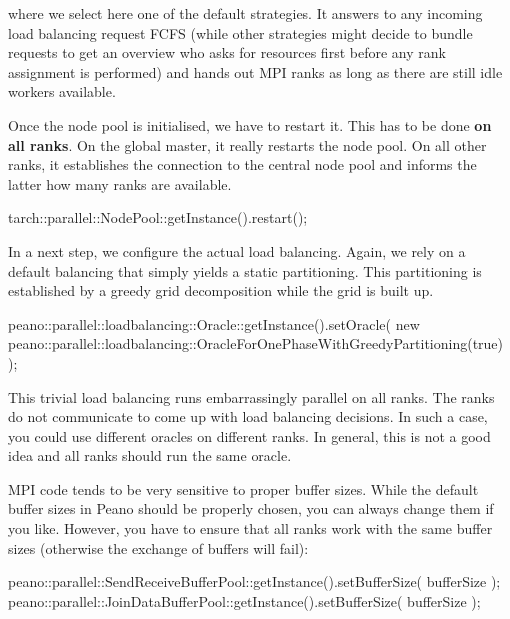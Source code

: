 \noindent
where we select here one of the default strategies. 
It answers to any incoming load balancing request FCFS (while other strategies
might decide to bundle requests to get an overview who asks for resources first
before any rank assignment is performed) and hands out MPI ranks as long as
there are still idle workers available.

Once the node pool is initialised, we have to restart it. 
This has to be done {\bf on all ranks}. 
On the global master, it really restarts the node pool.
On all other ranks, it establishes the connection to the central node pool
and informs the latter how many ranks are available.

\begin{code}
tarch::parallel::NodePool::getInstance().restart();
\end{code}

\noindent
In a next step, we configure the actual load balancing. 
Again, we rely on a default balancing that simply yields a static partitioning. 
This partitioning is established by a greedy grid decomposition while the grid
is built up.

\begin{code}
peano::parallel::loadbalancing::Oracle::getInstance().setOracle(
 new peano::parallel::loadbalancing::OracleForOnePhaseWithGreedyPartitioning(true)
);
\end{code}

\noindent
This trivial load balancing runs embarrassingly parallel on all ranks. 
The ranks do not communicate to come up with load balancing decisions.
In such a case, you could use different oracles on different ranks. 
In general, this is not a good idea and all ranks should run the same oracle.
 
 
MPI code tends to be very sensitive to proper buffer sizes.
While the default buffer sizes in Peano should be properly chosen, you can
always change them if you like.
However, you have to ensure that all ranks work with the same buffer sizes
(otherwise the exchange of buffers will fail):

\begin{code}
peano::parallel::SendReceiveBufferPool::getInstance().setBufferSize( bufferSize );
peano::parallel::JoinDataBufferPool::getInstance().setBufferSize( bufferSize );
\end{code}


